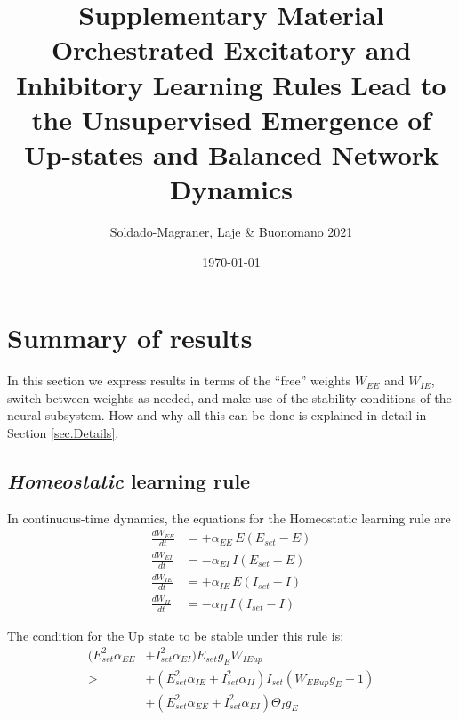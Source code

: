 \documentclass[twocolumn]{article}
\newcommand{\EE}{\mathit{EE}}
\newcommand{\EI}{\mathit{EI}}
\newcommand{\IE}{\mathit{IE}}
\newcommand{\II}{\mathit{II}}
\newcommand{\set}{\mathit{set}}
\newcommand{\up}{\mathit{up}}
\begin{document}
\title{\vspace{-2.0cm}Supplementary Material\\{\bf Orchestrated Excitatory and Inhibitory Learning Rules Lead to the Unsupervised Emergence of Up-states and Balanced Network Dynamics}}
\author{Soldado-Magraner, Laje \& Buonomano 2021}
\date{\today}

\maketitle

\tableofcontents

\section{Summary of results}

In this section we express results in terms of the ``free'' weights $W_{\EE}$ and $W_{\IE}$, switch between weights as needed, and make use of the stability conditions of the neural subsystem. How and why all this can be done is explained in detail in Section \ref{sec.Details}.


\subsection{{\em Homeostatic} learning rule}

In continuous-time dynamics, the equations for the Homeostatic learning rule are
\begin{equation}
\begin{aligned}
\frac{dW_{\EE}}{dt} & = +\alpha_{\EE} \, E (E_{\set} - E) \\
\frac{dW_{\EI}}{dt} & = -\alpha_{\EI} \, I (E_{\set} - E) \\
\frac{dW_{\IE}}{dt} & = +\alpha_{\IE} \, E (I_{\set} - I) \\
\frac{dW_{\II}}{dt} & = -\alpha_{\II} \, I (I_{\set} - I)
\end{aligned}
\label{eq.SH_summary}
\end{equation}

\noindent The condition for the Up state to be stable under this rule is:
\begin{equation}
\begin{aligned}
(E_{\set}^2 \alpha_{\EE} & + I_{\set}^2 \alpha_{\EI}) E_{\set} g_E W_{\IE\up} \\
> & + (E_{\set}^2 \alpha_{\IE} + I_{\set}^2 \alpha_{\II}) I_{\set}(W_{\EE\up} g_E - 1) \\
& + (E_{\set}^2 \alpha_{\EE} + I_{\set}^2 \alpha_{\EI}) \Theta_I g_E
\end{aligned}
\label{eq.SH_stable_cond_v1_summary}
\end{equation}
\end{document}
